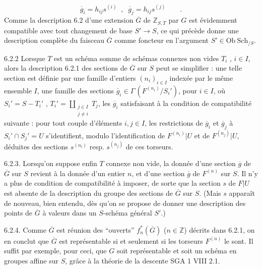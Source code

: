 \begin{equation*}
\overline{g}_i = h_{ij}s^{(i)} \;\;,\;\; \overline{g}_j = h_{ij}s^{(j)} \qquad .
\end{equation*}
Comme la description 6.2 d'une extension $\overline{G}$ de $\mathbb{Z}_{S,T}$ par $G$ est évidemment compatible avec tout changement de base $S' \longrightarrow S$, ce qui précède donne une description complète du faisceau $\overline{G}$ comme foncteur
en l'argument $S' \in \mathrm{Ob}\ \mathrm{Sch}_{/S}$.

6.2.2  Lorsque $T$ est un schéma somme de schémas connexes non vides $T_i$ , $i \in I$, alors la description 6.2.1 des sections de $\overline{G}$ sur $S$ peut se simplifier : une telle section est définie par une famille d'entiers $(n_i)_{i \in I}$ indexée par le même ensemble $I$, une famille des sections $\overline{g}_i \in \Gamma\,(F^{(n_i)}/S_i')$, pour $i \in I$, où $S_i' = S-T_i'$ , $T_i' = \coprod_{\substack{j \in I \\ j \neq i}} T_j$, les $\overline{g}_i$ satisfaisant à la condition de compatibilité suivante : pour tout couple d'éléments $i,j \in I$, les restrictions de $\overline{g}_i$ et $\overline{g}_j$ à $S_i' \cap S_j' = U$ s'identifient, modulo l'identification de $F^{(n_i)}|U$ et de $F^{(n_j)}|U$, déduites des sections $s^{(n_i)}$ resp. $s^{(n_j)}$ de ces torseurs.

6.2.3.  Lorsqu'on suppose enfin $T$ connexe non vide, la donnée d'une section $\overline{g}$ de $\overline{G}$ sur $S$ revient à la donnée d'un entier $n$, et d'une section $\overline{g}$ de $F^{(n)}$ sur $S$. Il n'y a plus de condition de compatibilité à imposer, de sorte que la section $s$ de $F|U$ est absente de la description du groupe des sections de $\overline{G}$ sur $S$. (Mais $s$ apparaît de nouveau, bien entendu, dès qu'on se propose de donner une description des points de $\overline{G}$ à valeurs dans un $S$-schéma général $S'$.)

6.2.4.  Comme $\overline{G}$ est réunion des ``ouverts'' $f^*_n(\overline{G})$ ($n \in \mathbb{Z}$) décrits dans 6.2.1, on en conclut que $\overline{G}$ est représentable si et seulement si les torseurs $F^{(n)}$ le sont. Il suffit par exemple, pour ceci, que $G$ soit représentable et soit un schéma en groupes affine sur $S$, grâce à la théorie de la descente SGA 1 VIII 2.1.



